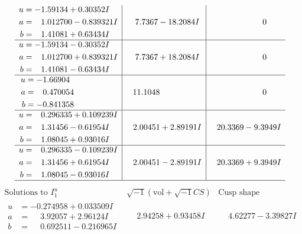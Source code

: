 \documentclass[1p]{elsarticle_modified}
\theoremstyle{definition}
\newcommand{\I}{\sqrt{-1}}
\begin{document}
$$\begin{array}{c|c|c}
\begin{aligned}
u &= -1.59134 + 0.30352 I \\
a &= \phantom{-}1.012700 - 0.839321 I \\
b &= \phantom{-}1.41081 + 0.63434 I\end{aligned}
 & \phantom{-}7.7367 - 18.2084 I & \phantom{-0.000000 } 0 \\ \hline\begin{aligned}
u &= -1.59134 - 0.30352 I \\
a &= \phantom{-}1.012700 + 0.839321 I \\
b &= \phantom{-}1.41081 - 0.63434 I\end{aligned}
 & \phantom{-}7.7367 + 18.2084 I & \phantom{-0.000000 } 0 \\ \hline\begin{aligned}
u &= -1.66904\phantom{ +0.000000I} \\
a &= \phantom{-}0.470054\phantom{ +0.000000I} \\
b &= -0.841358\phantom{ +0.000000I}\end{aligned}
 & \phantom{-}11.1048\phantom{ +0.000000I} & \phantom{-0.000000 } 0 \\ \hline\begin{aligned}
u &= \phantom{-}0.296335 + 0.109239 I \\
a &= \phantom{-}1.31456 - 0.61954 I \\
b &= \phantom{-}1.08045 + 0.93016 I\end{aligned}
 & \phantom{-}2.00451 + 2.89191 I & \phantom{-}20.3369 - 9.3949 I \\ \hline\begin{aligned}
u &= \phantom{-}0.296335 - 0.109239 I \\
a &= \phantom{-}1.31456 + 0.61954 I \\
b &= \phantom{-}1.08045 - 0.93016 I\end{aligned}
 & \phantom{-}2.00451 - 2.89191 I & \phantom{-}20.3369 + 9.3949 I\\
 \hline 
 \end{array}$$\newpage$$\begin{array}{c|c|c}  
\text{Solutions to }I^u_{1}& \I (\text{vol} + \sqrt{-1}CS) & \text{Cusp shape}\\
 \hline 
\begin{aligned}
u &= -0.274958 + 0.033509 I \\
a &= \phantom{-}3.92057 + 2.96124 I \\
b &= \phantom{-}0.692511 - 0.216965 I\end{aligned}
 & \phantom{-}2.94258 + 0.93458 I & \phantom{-}4.62277 - 3.39827 I \\ \hline\begin{aligned}

\end{aligned}
\end{array}$$
\end{document}
